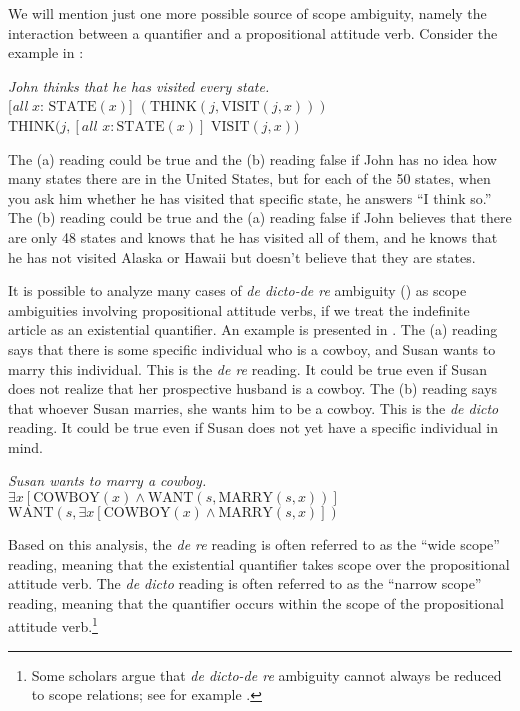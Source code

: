 {We will mention just one more possible source of scope ambiguity, namely the interaction between a quantifier and a propositional attitude verb. Consider the example in :


\ea \label{ex:14.39}
\textit{John thinks that he has visited every state.}\\
\ea \label{ex:14.}  [\textit{all} $x$: $\text{STATE}(x)$] $(\text{THINK}(j, \text{VISIT}(j,x)))$\\
\ex  $\text{THINK}(j, [\textit{all } x: \text{STATE}(x)]$ $\text{VISIT}(j,x))$
                       \z
\z


The (a) reading could be true and the (b) reading false if John has no idea how many states there are in the United States, but for each of the 50 states, when you ask him whether he has visited that specific state, he answers “I think so.” The (b) reading could be true and the (a) reading false if John believes that there are only 48 states and knows that he has visited all of them, and he knows that he has not visited Alaska or Hawaii but doesn’t believe that they are states.



It is possible to analyze many cases of \textit{de dicto-de re} ambiguity () as scope ambiguities involving propositional attitude verbs, if we treat the indefinite article as an existential quantifier. An example is presented in . The (a) reading says that there is some specific individual who is a cowboy, and Susan wants to marry this individual. This is the \textit{de re} reading. It could be true even if Susan does not realize that her prospective husband is a cowboy. The (b) reading says that whoever Susan marries, she wants him to be a cowboy. This is the \textit{de dicto} reading. It could be true even if Susan does not yet have a specific individual in mind.


\ea \label{ex:14.40}
\textit{Susan wants to marry a cowboy.}\\
\ea  $\exists x[\text{COWBOY}(x) \wedge \text{WANT}(s, \text{MARRY}(s,x))]$\\
\ex  $\text{WANT}(s, \exists x[\text{COWBOY}(x) \wedge \text{MARRY}(s,x)])$
                       \z
\z


Based on this analysis, the \textit{de re} reading is often referred to as the “wide scope” reading, meaning that the existential quantifier takes scope over the propositional attitude verb. The \textit{de dicto} reading is often referred to as the “narrow scope” reading, meaning that the quantifier occurs within the scope of the propositional attitude verb.\footnote{Some scholars argue that \textit{de dicto-de re} ambiguity cannot always be reduced to scope relations; see for example \citet{FodorSag1982}.}


}
